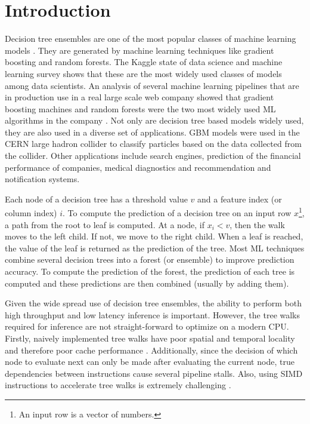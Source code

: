 \section{Introduction}
Decision tree ensembles are one of the most popular classes of machine learning models \cite{KaggleSurvey,LookingGlass}.
They are generated by machine learning techniques like gradient boosting and random forests. 
The Kaggle state of data science and machine learning survey \cite{KaggleSurvey} shows that 
these are the most widely used classes of models among data scientists. An analysis of 
several machine learning pipelines that are in production use in a real large scale web company showed that 
gradient boosting machines and random forests were the two most widely used ML algorithms in the company \cite{LookingGlass}.
Not only are decision tree based models widely used, they are also used in a diverse set of 
applications\cite{DecisionTreesOverview}. GBM models were used in the CERN large hadron collider
to classify particles based on the data collected from the collider\cite{LHCModel}. Other applications 
include search engines\cite{YahooSearch}, prediction of the financial performance of companies\cite{Finance},
medical diagnostics\cite{Med1, Med2} and recommendation and notification systems\cite{Facebook}.

Each node of a decision tree has a threshold value $v$ and a feature index (or column index) $i$.
To compute the prediction of a decision tree on an input row $x$\footnote{An input row is a
vector of numbers.}, a path from the root to leaf is computed. At a node, if $x_i < v$, then 
the walk moves to the left child. If not, we move to the right child. When a leaf is reached, 
the value of the leaf is returned as the prediction of the tree. 
Most ML techniques combine several decision trees into a forest (or ensemble) to improve prediction accuracy.
To compute the prediction of the forest, the prediction of each tree is computed and these predictions are 
then combined (usually by adding them). 

Given the wide spread use of decision tree ensembles, the ability to perform both high throughput and low latency inference is important.
However, the tree walks required for inference are not straight-forward to optimize on a modern CPU. 
Firstly, naively implemented tree walks have poor spatial and temporal locality and therefore poor cache performance \cite{FAST,MilindTreeVectorization}.
Additionally, since the decision of which node to evaluate next can only be made after evaluating the current node,
true dependencies between instructions cause several pipeline stalls. Also, using SIMD instructions to accelerate 
tree walks is extremely challenging \cite{MilindTreeVectorization}.


